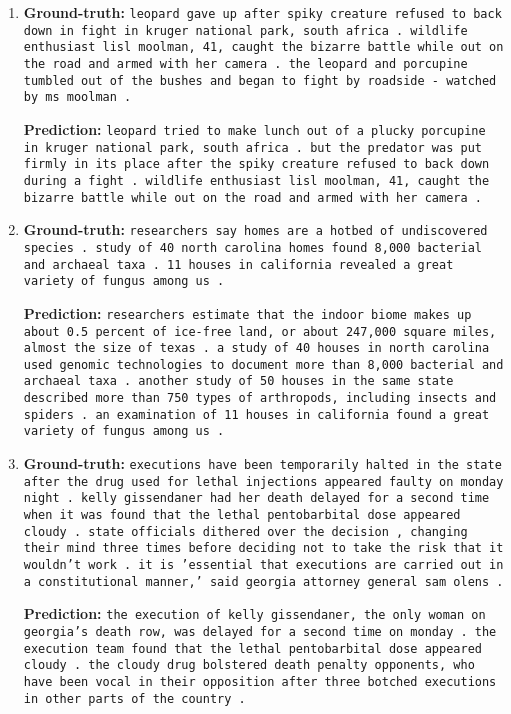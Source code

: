 \documentclass[twoside,11pt]{article}
\begin{document}
\begin{enumerate}
\item \textbf{Ground-truth:} \texttt{leopard gave up after spiky creature refused to back down in fight in kruger national park, south africa . wildlife enthusiast lisl moolman, 41, caught the bizarre battle while out on the road and armed with her camera . the leopard and porcupine tumbled out of the bushes and began to fight by roadside - watched by ms moolman .}

\textbf{Prediction:} \texttt{leopard tried to make lunch out of a plucky porcupine in kruger national park, south africa . but the predator was put firmly in its place after the spiky creature refused to back down during a fight . wildlife enthusiast lisl moolman, 41, caught the bizarre battle while out on the road and armed with her camera .}

\item \textbf{Ground-truth:} \texttt{researchers say homes are a hotbed of undiscovered species . study of 40 north carolina homes found 8,000 bacterial and archaeal taxa . 11 houses in california revealed a great variety of fungus among us .}

\textbf{Prediction:} \texttt{researchers estimate that the indoor biome makes up about 0.5 percent of ice-free land, or about 247,000 square miles, almost the size of texas . a study of 40 houses in north carolina used genomic technologies to document more than 8,000 bacterial and archaeal taxa . another study of 50 houses in the same state described more than 750 types of arthropods, including insects and spiders . an examination of 11 houses in california found a great variety of fungus among us .}

\item \textbf{Ground-truth:} \texttt{executions have been temporarily halted in the state after the drug used for lethal injections appeared faulty on monday night . kelly gissendaner had her death delayed for a second time when it was found that the lethal pentobarbital dose appeared cloudy . state officials dithered over the decision , changing their mind three times before deciding not to take the risk that it wouldn't work . it is 'essential that executions are carried out in a constitutional manner,' said georgia attorney general sam olens .}

\textbf{Prediction:} \texttt{the execution of kelly gissendaner, the only woman on georgia's death row, was delayed for a second time on monday . the execution team found that the lethal pentobarbital dose appeared cloudy . the cloudy drug bolstered death penalty opponents, who have been vocal in their opposition after three botched executions in other parts of the country .}


\end{enumerate}
\end{document}
